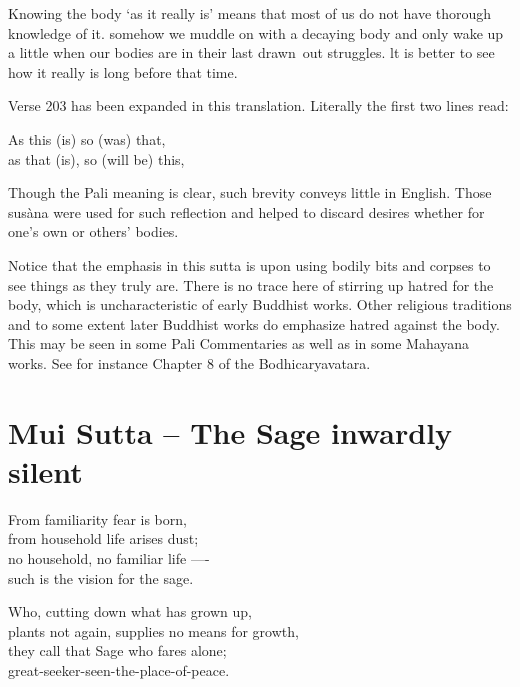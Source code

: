 Knowing the body `as it really is' means that most of us do not have thorough knowledge of it. somehow we muddle on with a decaying body and only wake up a little when our bodies are in their last drawn~out struggles. lt is better to see how it really is long before that time.

Verse 203 has been expanded in this translation. Literally the ﬁrst two
lines read:

\begin{MyDescription}[]{}
   As this (is) so (was) that,\\
   as that (is), so (will be) this,
\end{MyDescription}

Though the Pali meaning is clear, such brevity conveys little in English. Those sus\`ana were used for such reﬂection and helped to discard desires whether for   one's own or others' bodies. 

Notice that the emphasis in this sutta is upon using bodily bits and corpses  to see things as they truly are. There is no trace here of stirring up hatred for the body, which is uncharacteristic of early Buddhist works. Other religious traditions and to some extent later Buddhist works do emphasize hatred against the body. This may be seen in some Pali Commentaries as well as in some Mahayana works. See for instance Chapter 8 of the Bodhicaryavatara.

\chapter{Mui Sutta -- The Sage inwardly silent}

\begin{MyDescription}{}
From familiarity fear is born,\\
from household life arises dust;\\
no household, no familiar life —-\\
such is the vision for the sage. 
\end{MyDescription}

\begin{MyDescription}{}
Who, cutting down what has grown up,\\
plants not again, supplies no means for growth,\\
they call that Sage who fares alone;\\
great-seeker-seen-the-place-of-peace.
\end{MyDescription}

